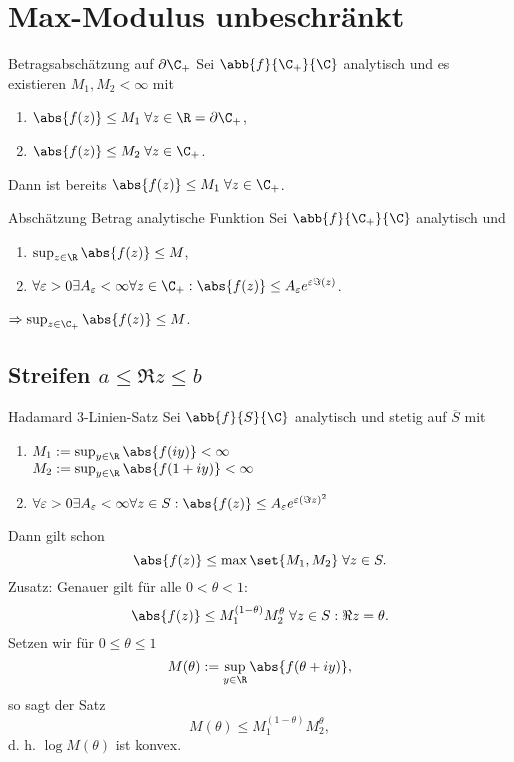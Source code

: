 \section{Max-Modulus unbeschränkt}

\begin{karte}{Betragsabschätzung auf \(\partial \C_+\)}
    Sei \(\abb{f}{\C_+}{\C}\) analytisch und es existieren \(M_1, M_2 < \infty\) mit 
    \begin{enumerate}
        \item \(\abs{f(z)} \leq M_1 \;\forall z\in \R = \partial \C_+\),
        \item \(\abs{f(z)} \leq M_2 \;\forall z\in \C_+\).
    \end{enumerate}
    Dann ist bereits \( \abs{f(z)} \leq M_1 \;\forall z\in \C_+ \).
\end{karte}

\begin{karte}{Abschätzung Betrag analytische Funktion}
    Sei \(\abb{f}{\C_+}{\C}\) analytisch und 
    \begin{enumerate}
        \item \( \sup_{z\in\R} \abs{f(z)} \leq M \),
        \item \(\forall \varepsilon > 0 \exists A_\varepsilon < \infty \forall z\in \C_+: \abs{f(z)} \leq A_\varepsilon e^{\varepsilon \Im(z)} \).
    \end{enumerate}
    \(\Rightarrow \sup_{z\in\C_+} \abs{f(z)} \leq M\).
\end{karte}

\subsection{Streifen \(a\leq \Re z \leq b\)}

\begin{karte}{Hadamard 3-Linien-Satz}
    Sei \(\abb{f}{S}{\C}\) analytisch und stetig auf \(\overline{S}\) mit 
    \begin{enumerate}
        \item \(M_1 := \sup_{y\in \R} \abs{f(iy)} < \infty\) \\
        \(M_2 := \sup_{y\in\R} \abs{f(1+iy)} < \infty \)
        \item \(\forall \varepsilon > 0 \exists A_\varepsilon < \infty \forall z\in S: 
        \abs{f(z)} \leq A_\varepsilon e^{\varepsilon (\Im z)^2}\)
    \end{enumerate}
    Dann gilt schon 
    \[ \abs{f(z)} \leq \max\set{M_1, M_2} \;\forall z\in S. \]
    Zusatz: Genauer gilt für alle \( 0 < \theta < 1\): 
    \[ \abs{f(z)} \leq M_1^{(1-\theta)} M_2^\theta \;\forall z\in S: \Re z = \theta. \]
    Setzen wir für \(0 \leq \theta \leq 1\)
    \[ M(\theta) := \sup_{y\in \R} \abs{f(\theta + iy)}, \]
    so sagt der Satz 
    \[ M(\theta) \leq M_1^{(1-\theta)} M_2^\theta, \]
    d. h. \(\log M(\theta)\) ist konvex.
\end{karte}